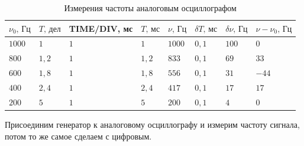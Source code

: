 \begin{table}[ht!]
    \caption{Измерения частоты аналоговым осциллографом}
    \begin{tabular}{|l|l|l|l|l|l|l|l|}
    \hline
    $\nu_0,\,\text{Гц}$ & $T,\,\text{дел}$ & TIME/DIV, мс & $T,\,\text{мс}$ & $\nu,\,\text{Гц}$ & $\delta T,\,\text{мс}$ & $\delta\nu,\,\text{Гц}$ & $\nu - \nu_0,\,\text{Гц}$ \\ \hline
    $1000$              & $1$              & $1$          & $1$             & $1000$            & $0{,}1$                & $100$                   & $0$                       \\ \hline
    $800$               & $1{,}2$          & $1$          & $1{,}2$         & $833$             & $0{,}1$                & $69$                    & $33$                      \\ \hline
    $600$               & $1{,}8$          & $1$          & $1{,}8$         & $556$             & $0{,}1$                & $31$                    & $-44$                     \\ \hline
    $400$               & $2{,}4$          & $1$          & $2{,}4$         & $417$             & $0{,}1$                & $17$                    & $17$                      \\ \hline
    $200$               & $5$              & $1$          & $5$             & $200$             & $0{,}1$                & $4$                     & $0$                       \\ \hline
    \end{tabular}
\end{table}

Присоединим генератор к аналоговому осциллографу и измерим частоту сигнала, потом то же
самое сделаем с цифровым.

